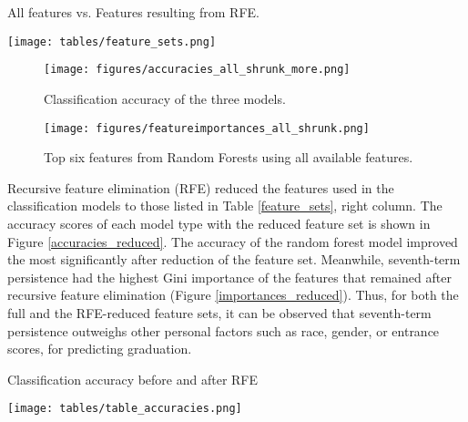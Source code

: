\documentclass[conference]{IEEEtran}
\begin{document}
\begin{table}[htbp]
\centering
\caption{All features vs. Features resulting from RFE.}
\texttt{[image: tables/feature\_sets.png]}
\label{feature_sets}
\end{table}

\begin{figure}[htbp]
\centering
\texttt{[image: figures/accuracies\_all\_shrunk\_more.png]}
\caption{Classification accuracy of the three models.}
\label{accuracies_all}
\end{figure}

\begin{figure}[htbp]
\centering
\texttt{[image: figures/featureimportances\_all\_shrunk.png]}
\caption{Top six features from Random Forests using all available features.}
\label{featureimportances_all}
\end{figure}

Recursive feature elimination (RFE) reduced the features used in the classification models to those listed in Table \ref{feature_sets}, right column.  The accuracy scores of each model type with the reduced feature set is shown in Figure \ref{accuracies_reduced}.  The accuracy of the random forest model improved the most significantly after reduction of the feature set.  Meanwhile,  seventh-term persistence had the highest Gini importance of the features that remained after recursive feature elimination (Figure \ref{importances_reduced}).  Thus, for both the full and the RFE-reduced feature sets, it can be observed that seventh-term persistence outweighs other personal factors such as race, gender, or entrance scores, for predicting graduation.    

\begin{table}[htbp]
\caption{Classification accuracy before and after RFE}
\texttt{[image: tables/table\_accuracies.png]}
\label{table_accuracies}
\end{table}
\end{document}
